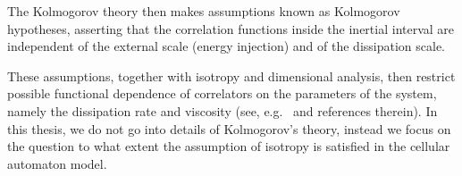 The Kolmogorov theory then makes assumptions known as Kolmogorov hypotheses, asserting that the correlation functions inside the inertial interval are independent of the external scale (energy injection) and of the dissipation scale.

These assumptions, together with isotropy and dimensional analysis, then restrict possible functional dependence of correlators on the parameters of the system, namely the dissipation rate and viscosity (see, e.g.\ \cite{scholtz} and references therein).  In this thesis, we do not go into details of Kolmogorov's theory, instead we focus on the question to what extent the assumption of isotropy is satisfied in the cellular automaton model.

%
%
%
%
%
%
%	

